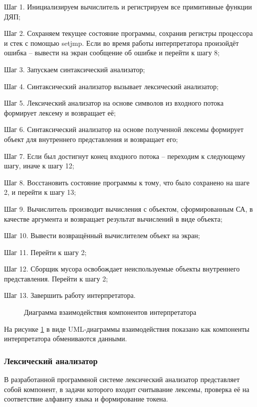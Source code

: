 Шаг 1. Инициализируем вычислитель и регистрируем все примитивные функции ДЯП;

Шаг 2. Сохраняем текущее состояние программы, сохранив регистры процессора и стек с помощью setjmp. Если во время работы интерпретатора произойдёт ошибка -- вывести на экран сообщение об ошибке и перейти к шагу 8;

Шаг 3. Запускаем синтаксический анализатор;

Шаг 4. Синтаксический анализатор вызывает лексический анализатор;

Шаг 5. Лексический анализатор на основе символов из входного потока формирует лексему и возвращает её;

Шаг 6. Синтаксический анализатор на основе полученной лексемы формирует объект для внутреннего представления и возвращает его;

Шаг 7. Если был достигнут конец входного потока -- переходим к следующему шагу, иначе к шагу 12;

Шаг 8. Восстановить состояние программы к тому, что было сохранено на шаге 2, и перейти к шагу 13;

Шаг 9. Вычислитель производит вычисления с объектом, сформированным СА, в качестве аргумента и возвращает результат вычислений в виде объекта;

Шаг 10. Вывести возвращённый вычислителем объект на экран;

Шаг 11. Перейти к шагу 2;

Шаг 12. Сборщик мусора освобождает неиспользуемые объекты внутреннего представления. Перейти к шагу 2;

Шаг 13. Завершить работу интерпретатора.


\begin{figure}[h!t]
	\caption{Диаграмма взаимодействия компонентов интерпретатора}
	\label{uml_coop:image}
\end{figure}

На рисунке \ref{uml_coop:image} в виде UML-диаграммы взаимодействия показано как компоненты интерпретатора обмениваются данными.

\subsubsection{Лексический анализатор}
В разработанной программной системе лексический анализатор представляет собой компонент, в задачи которого входит считывание лексемы, проверка её на соответствие алфавиту языка и формирование токена.

